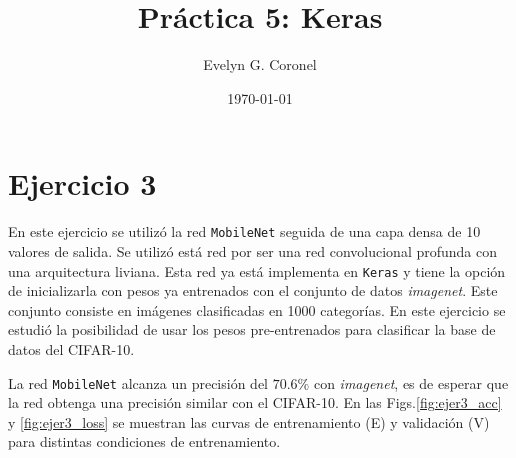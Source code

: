 
\usepackage{multirow}


\title{Práctica 5: Keras}
\author{Evelyn G. Coronel}


\date[]{\lowercase{\today}} 

\maketitle

\section*{Ejercicio 3}

    En este ejercicio se utilizó la red \verb|MobileNet| \cite{mobilenet} seguida de una capa densa de 10 valores de salida. Se utilizó está red por ser una red convolucional profunda con una arquitectura liviana.  Esta red ya está implementa en \verb|Keras| y tiene la opción de inicializarla con pesos ya entrenados con el conjunto de datos \emph{imagenet}. Este conjunto consiste en imágenes clasificadas en 1000 categorías. En este ejercicio se estudió la posibilidad de usar los pesos pre-entrenados para clasificar la base de datos del CIFAR-10.

    La red \verb|MobileNet| alcanza un precisión del $70.6\%$ con \emph{imagenet}\cite{mobilenet}, es de esperar que la red obtenga una precisión similar con el CIFAR-10. En las Figs.\ref{fig:ejer3_acc} y \ref{fig:ejer3_loss} se muestran las curvas de entrenamiento (E) y validación  (V) para distintas condiciones de entrenamiento. 

